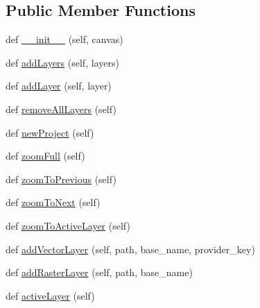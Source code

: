 \subsection*{Public Member Functions}
\begin{DoxyCompactItemize}
\item 
def \mbox{\hyperlink{class_dsg_tools_1_1test_1_1qgis__interface_1_1_qgis_interface_a1cf8dd282a40571c5788ac6351ce3b47}{\+\_\+\+\_\+init\+\_\+\+\_\+}} (self, canvas)
\item 
def \mbox{\hyperlink{class_dsg_tools_1_1test_1_1qgis__interface_1_1_qgis_interface_a79e022db1fda34569e5b5f7f9e6b5d3a}{add\+Layers}} (self, layers)
\item 
def \mbox{\hyperlink{class_dsg_tools_1_1test_1_1qgis__interface_1_1_qgis_interface_af2c8f477fd5f365124ed2008e7711aa2}{add\+Layer}} (self, layer)
\item 
def \mbox{\hyperlink{class_dsg_tools_1_1test_1_1qgis__interface_1_1_qgis_interface_a868ebc678763593d40bda659e11d28df}{remove\+All\+Layers}} (self)
\item 
def \mbox{\hyperlink{class_dsg_tools_1_1test_1_1qgis__interface_1_1_qgis_interface_aef37cdcf4fd0cb7d64c31b2c538741ab}{new\+Project}} (self)
\item 
def \mbox{\hyperlink{class_dsg_tools_1_1test_1_1qgis__interface_1_1_qgis_interface_a2c8021317665b4894761e0d729a506e4}{zoom\+Full}} (self)
\item 
def \mbox{\hyperlink{class_dsg_tools_1_1test_1_1qgis__interface_1_1_qgis_interface_a77f9c624b6571988282de487ede3cf61}{zoom\+To\+Previous}} (self)
\item 
def \mbox{\hyperlink{class_dsg_tools_1_1test_1_1qgis__interface_1_1_qgis_interface_af69cfe8bde98f333ed17e37ddc320e9f}{zoom\+To\+Next}} (self)
\item 
def \mbox{\hyperlink{class_dsg_tools_1_1test_1_1qgis__interface_1_1_qgis_interface_aa61352a15fa467f1abb4338aa1347451}{zoom\+To\+Active\+Layer}} (self)
\item 
def \mbox{\hyperlink{class_dsg_tools_1_1test_1_1qgis__interface_1_1_qgis_interface_ad95653df27b570fb359d56334141ff92}{add\+Vector\+Layer}} (self, path, base\+\_\+name, provider\+\_\+key)
\item 
def \mbox{\hyperlink{class_dsg_tools_1_1test_1_1qgis__interface_1_1_qgis_interface_aac206533e846e062e907d0dd9c9d4565}{add\+Raster\+Layer}} (self, path, base\+\_\+name)
\item 
def \mbox{\hyperlink{class_dsg_tools_1_1test_1_1qgis__interface_1_1_qgis_interface_a64ffa1be69550b21bcb77f8cf738f60c}{active\+Layer}} (self)

\end{DoxyCompactItemize}
